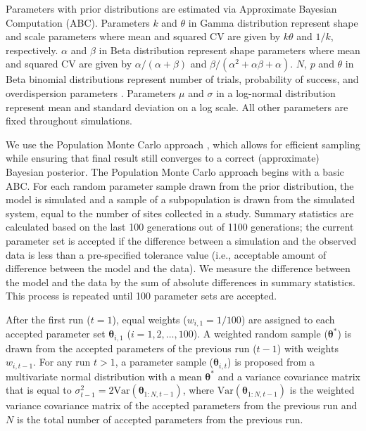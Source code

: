 \documentclass{article}\usepackage[]{graphicx}\usepackage[]{color}
\begin{document}
{\begin{landscape}
\begin{table}[h]
{Parameters with prior distributions are estimated via Approximate Bayesian Computation (ABC).
Parameters $k$ and $\theta$ in Gamma distribution represent shape and scale parameters where mean and squared CV are given by $k \theta$ and $1/k$, respectively.
$\alpha$ and $\beta$ in Beta distribution represent shape parameters where mean and squared CV are given by $\alpha/(\alpha+\beta)$ and $\beta/(\alpha^2 + \alpha \beta + \alpha)$.
$N$, $p$ and $\theta$ in Beta binomial distributions represent number of trials, probability of success, and overdispersion parameters \citep{morris1983natural}.
Parameters $\mu$ and $\sigma$ in a log-normal distribution represent mean and standard deviation on a log scale.
All other parameters are fixed throughout simulations.
}
\label{tb:param}
\end{table}
\end{landscape}
}

We use the Population Monte Carlo approach \citep{turner2012tutorial}, which allows for efficient sampling while ensuring that final result still converges to a correct (approximate) Bayesian posterior.
The Population Monte Carlo approach begins with a basic ABC.
For each random parameter sample drawn from the prior distribution, the model is simulated and a sample of a subpopulation is drawn from the simulated system, equal to the number of sites collected in a study.
Summary statistics are calculated based on the last 100 generations out of 1100 generations; the current parameter set is accepted if the difference between a simulation and the observed data is less than a pre-specified tolerance value (i.e., acceptable amount of difference between the model and the data).
We measure the difference between the model and the data by the sum of absolute differences in summary statistics. 
This process is repeated until 100 parameter sets are accepted.

After the first run ($t=1$), equal weights ($w_{i,1}=1/100$) are assigned to each accepted parameter set $\bm\theta_{i, 1}$ ($i = 1, 2, \dots, 100$).
A weighted random sample ($\bm\theta^\ast$) is drawn from the accepted parameters of the previous run ($t-1$) with weights $w_{i,t-1}$.
For any run $t > 1$, a parameter sample ($\bm\theta_{i, t}$) is proposed from a multivariate normal distribution with a mean $\bm\theta^\ast$ and a variance covariance matrix that is equal to $\sigma_{t-1}^2=2 \mathrm{Var}(\bm\theta_{1:N, t-1})$, where $\mathrm{Var}(\bm\theta_{1:N, t-1})$ is the weighted variance covariance matrix of the accepted parameters from the previous run and $N$ is the total number of accepted parameters from the previous run.
\end{document}
